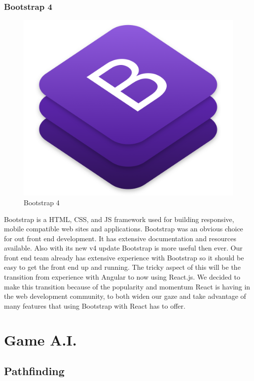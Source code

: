 \documentclass[12pt,a4paper]{report}
\begin{document}
			\subsubsection{Bootstrap 4}
			\begin{figure}
				\includegraphics[scale=0.1]{bootstrap4}
				\caption{Bootstrap 4}
				\label{Bootstrap 4}
			\end{figure}
			Bootstrap is a HTML, CSS, and JS framework used for building responsive, mobile compatible web sites and applications. Bootstrap was an obvious choice for out front end development. It has extensive documentation and resources available. Also with its new v4 update Bootstrap is more useful then ever. Our front end team already has extensive experience with Bootstrap so it should be easy to get the front end up and running. The tricky aspect of this will be the transition from experience with Angular to now using React.js. We decided to make this transition because of the popularity and momentum React is having in the web development community, to both widen our gaze and take advantage of many features that using Bootstrap with React has to offer.
			
	\section{Game A.I.}
		\subsection{Pathfinding}
\end{document}
